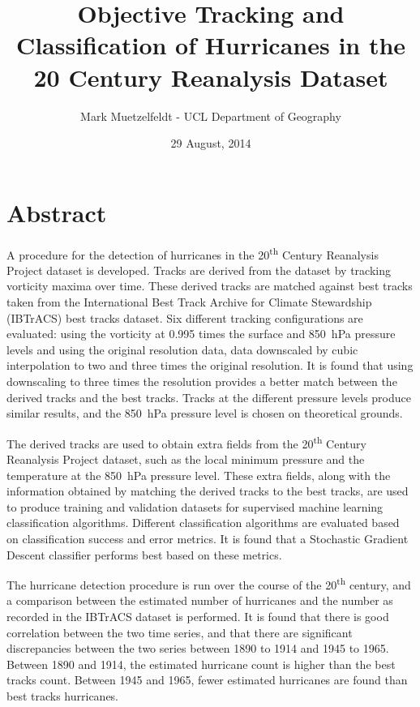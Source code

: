 \documentclass[pdftex,12pt,a4paper]{report}
\title{Objective Tracking and Classification of Hurricanes in the 20\ts{th} Century Reanalysis Dataset}
\author{Mark Muetzelfeldt - UCL Department of Geography}
\date{29 August, 2014}
\newcommand{\ts}{\textsuperscript}
\begin{document}


\clearpage
\thispagestyle{empty}
\null
\addtocounter{page}{-1}%
\newpage

\onehalfspacing
\section*{Abstract}

A procedure for the detection of hurricanes in the 20\ts{th} Century Reanalysis Project dataset is
developed. Tracks are derived from the dataset by tracking vorticity maxima over time. These derived
tracks are matched against best tracks taken from the International Best Track Archive for Climate
Stewardship (IBTrACS) best tracks dataset. Six different tracking configurations are evaluated:
using the vorticity at 0.995 times the surface and \SI{850}{hPa} pressure levels and using the
original resolution data, data downscaled by cubic interpolation to two and three times the original
resolution. It is found that using downscaling to three times the resolution provides a better match
between the derived tracks and the best tracks. Tracks at the different pressure levels produce
similar results, and the \SI{850}{hPa} pressure level is chosen on theoretical grounds.

The derived tracks are used to obtain extra fields from the 20\ts{th} Century Reanalysis
Project dataset, such as the local minimum pressure and the temperature at the \SI{850}{hPa}
pressure level. These extra fields, along with the information obtained by matching the derived
tracks to the best tracks, are used to produce training and validation datasets for supervised
machine learning classification algorithms. Different classification algorithms are evaluated based
on classification success and error metrics. It is found that a Stochastic Gradient Descent
classifier performs best based on these metrics.

The hurricane detection procedure is run over the course of the 20\ts{th} century, and a comparison
between the estimated number of hurricanes and the number as recorded in the IBTrACS dataset is
performed. It is found that there is good correlation between the two time series, and that there
are significant discrepancies between the two series between 1890 to 1914 and 1945 to 1965. Between
1890 and 1914, the estimated hurricane count is higher than the best tracks count. Between 1945 and
1965, fewer estimated hurricanes are found than best tracks hurricanes. 
\end{document}
